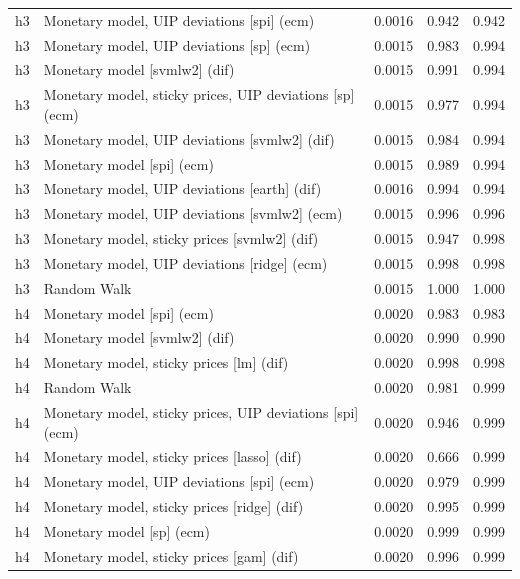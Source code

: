 \begin{ThreePartTable}
\begin{longtable}[t]{cp{5.5cm}ccc}
\addlinespace
h3 & \raggedright Monetary model, UIP deviations [spi] (ecm) & 0.0016 & 0.942 & 0.942\\
h3 & \raggedright Monetary model, UIP deviations [sp] (ecm) & 0.0015 & 0.983 & 0.994\\
h3 & \raggedright Monetary model [svmlw2] (dif) & 0.0015 & 0.991 & 0.994\\
h3 & \raggedright Monetary model, sticky prices, UIP deviations [sp] (ecm) & 0.0015 & 0.977 & 0.994\\
h3 & \raggedright Monetary model, UIP deviations [svmlw2] (dif) & 0.0015 & 0.984 & 0.994\\
h3 & \raggedright Monetary model [spi] (ecm) & 0.0015 & 0.989 & 0.994\\
h3 & \raggedright Monetary model, UIP deviations [earth] (dif) & 0.0016 & 0.994 & 0.994\\
h3 & \raggedright Monetary model, UIP deviations [svmlw2] (ecm) & 0.0015 & 0.996 & 0.996\\
h3 & \raggedright Monetary model, sticky prices [svmlw2] (dif) & 0.0015 & 0.947 & 0.998\\
h3 & \raggedright Monetary model, UIP deviations [ridge] (ecm) & 0.0015 & 0.998 & 0.998\\
h3 & \raggedright Random Walk & 0.0015 & 1.000 & 1.000\\
\addlinespace
h4 & \raggedright Monetary model [spi] (ecm) & 0.0020 & 0.983 & 0.983\\
h4 & \raggedright Monetary model [svmlw2] (dif) & 0.0020 & 0.990 & 0.990\\
h4 & \raggedright Monetary model, sticky prices [lm] (dif) & 0.0020 & 0.998 & 0.998\\
h4 & \raggedright Random Walk & 0.0020 & 0.981 & 0.999\\
h4 & \raggedright Monetary model, sticky prices, UIP deviations [spi] (ecm) & 0.0020 & 0.946 & 0.999\\
h4 & \raggedright Monetary model, sticky prices [lasso] (dif) & 0.0020 & 0.666 & 0.999\\
h4 & \raggedright Monetary model, UIP deviations [spi] (ecm) & 0.0020 & 0.979 & 0.999\\
h4 & \raggedright Monetary model, sticky prices [ridge] (dif) & 0.0020 & 0.995 & 0.999\\
h4 & \raggedright Monetary model [sp] (ecm) & 0.0020 & 0.999 & 0.999\\
h4 & \raggedright Monetary model, sticky prices [gam] (dif) & 0.0020 & 0.996 & 0.999\\

\end{longtable}
\end{ThreePartTable}
